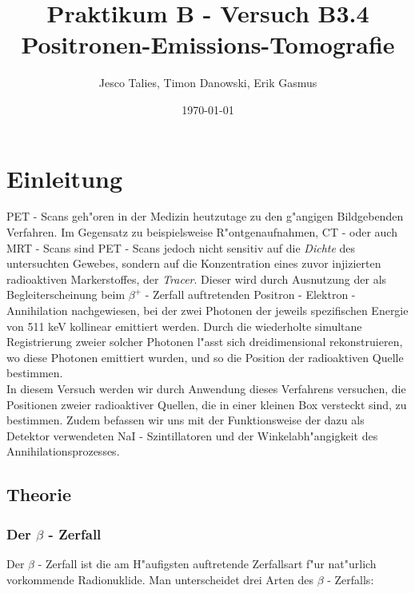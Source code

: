 \documentclass{article}
\begin{document}
    \title{Praktikum B - Versuch B3.4 Positronen-Emissions-Tomografie}
    \date{\today}
    \author{Jesco Talies, Timon Danowski, Erik Gasmus}
    \maketitle
    \newpage

    \tableofcontents
    \newpage

\section{Einleitung}

PET - Scans geh"oren in der Medizin heutzutage zu den g"angigen Bildgebenden Verfahren. Im Gegensatz zu beispielsweise R"ontgenaufnahmen, CT - oder auch MRT - Scans sind PET -  Scans jedoch nicht sensitiv auf die \textit{Dichte} des untersuchten Gewebes, sondern auf die Konzentration eines zuvor injizierten radioaktiven Markerstoffes, der \textit{Tracer}. Dieser wird durch Ausnutzung der als Begleiterscheinung beim $\beta^+$ - Zerfall auftretenden Positron - Elektron - Annihilation nachgewiesen, bei der zwei Photonen der jeweils spezifischen Energie von 511 keV kollinear emittiert werden. Durch die wiederholte simultane Registrierung zweier solcher Photonen l"asst sich dreidimensional rekonstruieren, wo diese Photonen emittiert wurden, und so die Position der radioaktiven Quelle bestimmen. \\
In diesem Versuch werden wir durch Anwendung dieses Verfahrens versuchen, die Positionen zweier radioaktiver Quellen, die in einer kleinen Box versteckt sind, zu bestimmen. Zudem befassen wir uns mit der Funktionsweise der dazu als Detektor verwendeten NaI - Szintillatoren und der Winkelabh"angigkeit des Annihilationsprozesses.


\subsection{Theorie}


\subsubsection{Der $\beta$ - Zerfall}


Der $\beta$ - Zerfall ist die am H"aufigsten auftretende Zerfallsart f"ur nat"urlich vorkommende Radionuklide. Man unterscheidet drei Arten des $\beta$ - Zerfalls:
\end{document}
